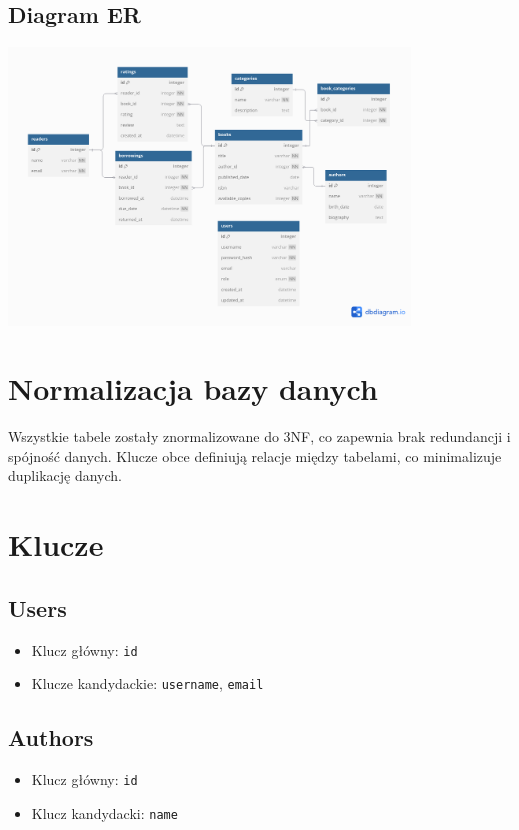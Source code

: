 \documentclass{article}
\begin{document}
\subsection*{Diagram ER}
\begin{center}
    \includegraphics[width=0.8\textwidth]{diagram.png}
\end{center}

\section*{Normalizacja bazy danych}
Wszystkie tabele zostały znormalizowane do 3NF, co zapewnia brak redundancji i spójność danych. Klucze obce definiują relacje między tabelami, co minimalizuje duplikację danych.

\section*{Klucze}
\subsection*{Users}
\begin{itemize}
    \item Klucz główny: \texttt{id}
    \item Klucze kandydackie: \texttt{username}, \texttt{email}
\end{itemize}

\subsection*{Authors}
\begin{itemize}
    \item Klucz główny: \texttt{id}
    \item Klucz kandydacki: \texttt{name}
\end{itemize}
\end{document}
